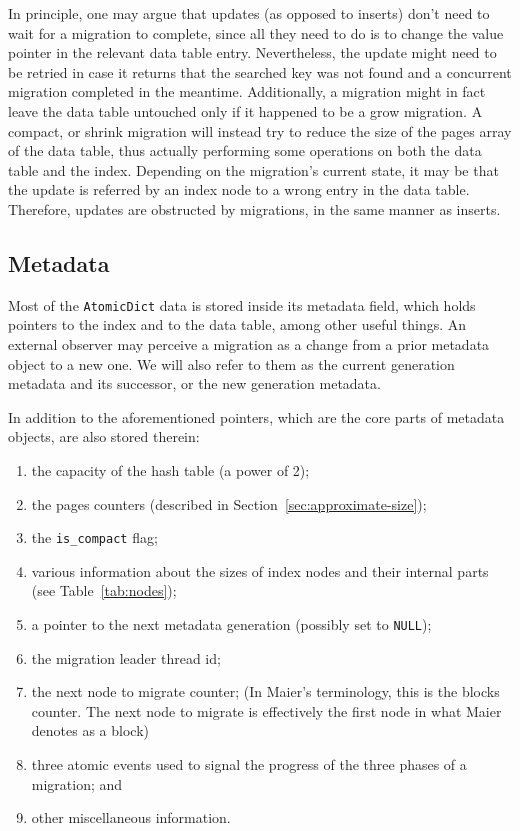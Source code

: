 In principle, one may argue that updates (as opposed to inserts) don't need to wait for a migration to complete, since all they need to do is to change the value pointer in the relevant data table entry.
Nevertheless, the update might need to be retried in case it returns that the searched key was not found and a concurrent migration completed in the meantime.
Additionally, a migration might in fact leave the data table untouched only if it happened to be a grow migration.
A compact, or shrink migration will instead try to reduce the size of the pages array of the data table, thus actually performing some operations on both the data table and the index.
Depending on the migration's current state, it may be that the update is referred by an index node to a wrong entry in the data table.
Therefore, updates are obstructed by migrations, in the same manner as inserts.

\subsection{Metadata}\label{subsec:metadata}
Most of the \texttt{AtomicDict} data is stored inside its metadata field, which holds pointers to the index and to the data table, among other useful things.
An external observer may perceive a migration as a change from a prior metadata object to a new one.
We will also refer to them as the current generation metadata and its successor, or the new generation metadata.

In addition to the aforementioned pointers, which are the core parts of metadata objects, are also stored therein:
\begin{enumerate}
    \item the capacity of the hash table (a power of 2);
    \item the pages counters (described in Section~\ref{sec:approximate-size});
    \item the \texttt{is\_compact} flag;
    \item various information about the sizes of index nodes and their internal parts (see Table~\ref{tab:nodes});
    \item a pointer to the next metadata generation (possibly set to \texttt{NULL});
    \item the migration leader thread id;
    \item the next node to migrate counter; (In Maier's terminology, this is the blocks counter.
    The next node to migrate is effectively the first node in what Maier denotes as a block)
    \item three atomic events used to signal the progress of the three phases of a migration; and
    \item other miscellaneous information.
\end{enumerate}

